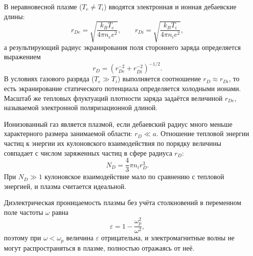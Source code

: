 \documentclass[reprint, amsmath, amssymb, aps, pra, nofootinbib]{revtex4-2}
\begin{document}
В неравновесной плазме ($T_e \neq T_i$) вводятся электронная и ионная дебаевские длины:
\begin{equation}
r_{De} = \sqrt{\frac{k_B T_e}{4\pi n_e e^2}}, \qquad r_{Di} = \sqrt{\frac{k_B T_i}{4\pi n_i e^2}}, \label{eq:r_De_Di}
\end{equation}
а результирующий радиус экранирования поля стороннего заряда определяется выражением
\begin{equation}
r_D = \left(r_{De}^{-2} + r_{Di}^{-2}\right)^{-1/2}. \label{eq:r_D}
\end{equation}
В условиях газового разряда ($T_e \gg T_i$) выполняется соотношение $r_D \approx r_{Di}$, то есть экранирование статического потенциала определяется холодными ионами. Масштаб же тепловых флуктуаций плотности заряда задаётся величиной $r_{De}$, называемой электронной поляризационной длиной.

Ионизованный газ является плазмой, если дебаевский радиус много меньше характерного размера занимаемой области: $r_D \ll a$. Отношение тепловой энергии частиц к энергии их кулоновского взаимодействия по порядку величины совпадает с числом заряженных частиц в сфере радиуса $r_D$:
\begin{equation}
N_D = \frac{4}{3}\pi n_i r_D^3. \label{eq:N_D}
\end{equation}
При $N_D \gg 1$ кулоновское взаимодействие мало по сравнению с тепловой энергией, и плазма считается идеальной.

Диэлектрическая проницаемость плазмы без учёта столкновений в переменном поле частоты $\omega$ равна
\begin{equation}
\varepsilon = 1 - \frac{\omega_p^2}{\omega^2}, \label{eq:epsilon}
\end{equation}
поэтому при $\omega < \omega_p$ величина $\varepsilon$ отрицательна, и электромагнитные волны не могут распространяться в плазме, полностью отражаясь от неё.
\end{document}
